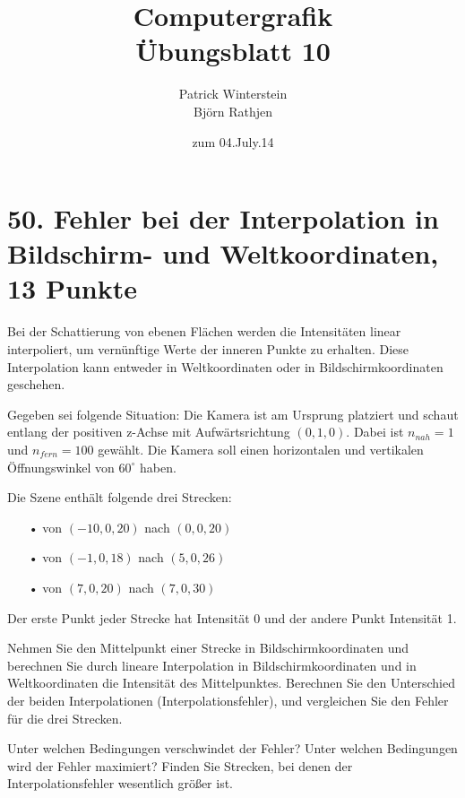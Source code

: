 \documentclass[11pt]{article}
\title{Computergrafik\\Übungsblatt 10}
\author{Patrick Winterstein\\Björn Rathjen}
\date{zum 04.July.14}
\begin{document}
\maketitle
\newpage
\section*{50. Fehler bei der Interpolation in Bildschirm- und Weltkoordinaten, 13 Punkte}

Bei der Schattierung von ebenen Flächen werden die Intensitäten linear interpoliert, um vernünftige Werte der inneren Punkte zu erhalten. Diese Interpolation kann entweder in Weltkoordinaten oder in Bildschirmkoordinaten geschehen.

Gegeben sei folgende Situation: Die Kamera ist am Ursprung platziert und schaut entlang der positiven z-Achse mit Aufwärtsrichtung $(0, 1, 0)$. Dabei ist $n_{nah} = 1$ und $n_{fern} = 100$ gewählt. Die Kamera soll einen horizontalen und vertikalen Öffnungswinkel von $60^\circ $ haben. 

Die Szene enthält folgende drei Strecken:
\begin{itemize}
\item[•] von $(-10, 0, 20)$ nach $(0, 0, 20)$
\item[•] von $(-1, 0, 18)$ nach $(5, 0, 26)$
\item[•] von $(7, 0, 20)$ nach $(7, 0, 30)$
\end{itemize}
Der erste Punkt jeder Strecke hat Intensität 0 und der andere Punkt Intensität 1.

Nehmen Sie den Mittelpunkt einer Strecke in Bildschirmkoordinaten und berechnen Sie durch lineare Interpolation in Bildschirmkoordinaten und in Weltkoordinaten die Intensität des Mittelpunktes. Berechnen Sie den Unterschied der beiden Interpolationen (Interpolationsfehler), und vergleichen Sie den Fehler für die drei Strecken.

Unter welchen Bedingungen verschwindet der Fehler? Unter welchen Bedingungen wird der Fehler maximiert? Finden Sie Strecken, bei denen der Interpolationsfehler wesentlich größer ist.

\newpage
\end{document}
